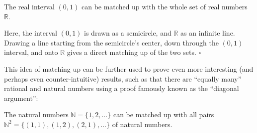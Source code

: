 \begin{theorem}
\label{thm:infbij1}
The real interval $(0,1)$ can be matched up with the whole set of real numbers~$\mathbb{R}$.
\end{theorem}


\begin{center}
\end{center}
Here, the interval $(0,1)$ is drawn as a semicircle, and $\mathbb{R}$ as an infinite line.
Drawing a line starting from the semicircle's center, down through the $(0,1)$ interval,
and onto $\mathbb{R}$ gives a direct matching up of the two sets.
\hfill$\square$

\medskip

This idea of matching up can be further used to prove even more
interesting (and perhaps even counter-intuitive) results, such as that
there are ``equally many'' rational and natural numbers using a proof
famously known as the ``diagonal argument'':

\begin{theorem}
\label{thm:infbij2}
The natural numbers $\mathbb{N} = \{1,2,\ldots\}$ can be matched up with
all pairs $\mathbb{N}^2 = \{(1,1),(1,2),(2,1),\ldots\}$ of natural numbers.
\end{theorem}


